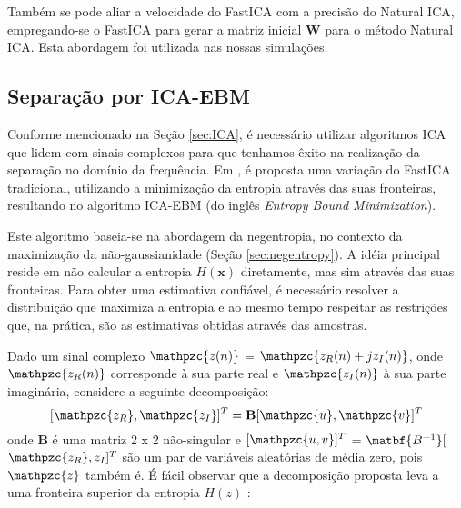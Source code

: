        Também se pode aliar a velocidade do FastICA com a precisão do Natural ICA, empregando-se o FastICA para gerar a matriz inicial $\mathbf{W}$ para o método Natural ICA. Esta abordagem foi utilizada nas nossas simulações.
    
    \subsection{Separação por ICA-EBM}
        
    Conforme mencionado na Seção \ref{sec:ICA}, é necessário utilizar algoritmos ICA que lidem com sinais complexos para que tenhamos êxito na realização da separação no domínio da frequência. Em \cite{fasticaebm}, é proposta uma variação do FastICA tradicional, utilizando a minimização da entropia através das suas fronteiras, resultando no algoritmo ICA-EBM (do inglês \textit{Entropy Bound Minimization}).
        
    Este algoritmo baseia-se na abordagem da negentropia, no contexto da maximização da não-gaussianidade (Seção \ref{sec:negentropy}). A idéia principal reside em não calcular a entropia $H(\mathbf{x})$ diretamente, mas sim através das suas fronteiras. Para obter uma estimativa confiável, é necessário resolver a distribuição que maximiza a entropia e ao mesmo tempo respeitar as restrições que, na prática, são as estimativas obtidas através das amostras. 
        
    Dado um sinal complexo $\mathpzc{z(n)}$ = $\mathpzc{z_R(n) + jz_I(n)}$, onde $\mathpzc{z_R(n)}$ corresponde à sua parte real e $\mathpzc{z_I(n)}$ à sua parte imaginária, considere a seguinte decomposição:
    \begin{equation}
        \label{eq:decomposition1}
            [\mathpzc{z_R}, \mathpzc{z_I}]^T =
            \mathbf{B}[\mathpzc{u},\mathpzc{v}]^T
    \end{equation}
    onde $\mathbf{B}$ é uma matriz 2 x 2 não-singular e $[\mathpzc{u,v}]^T$ = $\matbf{B^{-1}}[$ $\mathpzc{z_R},{z_I}]^T$ são um par de variáveis aleatórias de média zero, pois $\mathpzc{z}$ também é. É fácil observar que a decomposição proposta leva a uma fronteira superior da entropia ${H(z)}$ \cite{entropy}:
        
